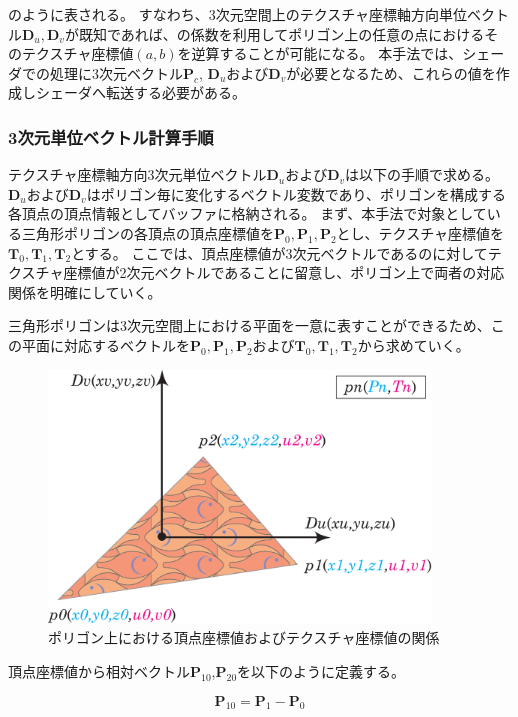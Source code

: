 \noindent
{}のように表される。
すなわち、3次元空間上のテクスチャ座標軸方向単位ベクトル$\bm{D}_u, \bm{D}_v$が既知であれば、の係数を利用してポリゴン上の任意の点におけるそのテクスチャ座標値$(a, b)$を逆算することが可能になる。
本手法では、シェーダでの処理に3次元ベクトル$\bm{P}_c$, $\bm{D}_u$および$\bm{D}_v$が必要となるため、これらの値を作成しシェーダへ転送する必要がある。

\subsubsection*{3次元単位ベクトル計算手順}

テクスチャ座標軸方向3次元単位ベクトル$\bm{D}_u$および$\bm{D}_v$は以下の手順で求める。
$\bm{D}_u$および$\bm{D}_v$はポリゴン毎に変化するベクトル変数であり、ポリゴンを構成する各頂点の頂点情報としてバッファに格納される。
まず、本手法で対象としている三角形ポリゴンの各頂点の頂点座標値を$\bm{P}_0,\bm{P}_1,\bm{P}_2$とし、テクスチャ座標値を$\bm{T}_0,\bm{T}_1,\bm{T}_2$とする。
ここでは、頂点座標値が3次元ベクトルであるのに対してテクスチャ座標値が2次元ベクトルであることに留意し、ポリゴン上で両者の対応関係を明確にしていく。

三角形ポリゴンは3次元空間上における平面を一意に表すことができるため、この平面に対応するベクトルを$\bm{P}_0,\bm{P}_1,\bm{P}_2$および$\bm{T}_0,\bm{T}_1,\bm{T}_2$から求めていく。

\begin{figure}[h]
  \centering
  \includegraphics[width=4.0in]{./img/polygon_explain.eps}
  \caption{ポリゴン上における頂点座標値およびテクスチャ座標値の関係}
  \label{FVertexandtexture}
\end{figure}

\noindent
頂点座標値から相対ベクトル$\bm{P}_{10}$,$\bm{P}_{20}$を以下のように定義する。

\begin{equation}
\bm{P}_{10} = \bm{P}_1 - \bm{P}_0
\label{EP10}
\end{equation}

